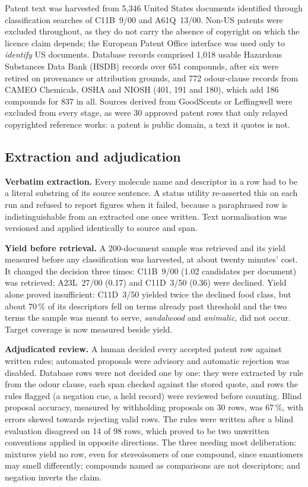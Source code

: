 \documentclass[
  computerscience
]{genesisl1-paper}
\begin{document}
Patent text was harvested from 5{,}346 United States documents identified through
classification searches of C11B~9/00 and A61Q~13/00. Non-US patents were excluded
throughout, as they do not carry the absence of copyright on which the licence claim
depends; the European Patent Office interface was used only to \emph{identify} US
documents. Database records comprised 1{,}018 usable Hazardous Substances Data Bank
(HSDB) records over 651 compounds, after six were retired on provenance or attribution
grounds, and 772 odour-clause records from CAMEO Chemicals, OSHA and NIOSH (401, 191 and
180), which add 186 compounds for 837 in all. Sources derived from GoodScents or
Leffingwell were excluded from every stage, as were 30 approved patent rows that only
relayed copyrighted reference works: a patent is public domain, a text it quotes is not.

\subsection{Extraction and adjudication}

\textbf{Verbatim extraction.} Every molecule name and descriptor in a row had to be a
literal substring of its source sentence. A status utility re-asserted this on each run
and refused to report figures when it failed, because a paraphrased row is
indistinguishable from an extracted one once written. Text normalisation was versioned and
applied identically to source and span.

\textbf{Yield before retrieval.} A 200-document sample was retrieved and its yield
measured before any classification was harvested, at about twenty minutes' cost. It
changed the decision three times: C11B~9/00 (1.02 candidates per document) was
retrieved; A23L~27/00 (0.17) and C11D~3/50 (0.36) were declined. Yield alone proved
insufficient: C11D~3/50 yielded twice the declined food class, but about 70\,\% of its
descriptors fell on terms already past threshold and the two terms the sample was meant
to serve, \emph{sandalwood} and \emph{animalic}, did not occur. Target coverage is now
measured beside yield.

\textbf{Adjudicated review.} A human decided every accepted patent row against written
rules; automated proposals were advisory and automatic rejection was disabled. Database
rows were not decided one by one: they were extracted by rule from the odour clause, each
span checked against the stored quote, and rows the rules flagged (a negation cue, a held
record) were reviewed before counting. Blind proposal
accuracy, measured by withholding proposals on 30 rows, was 67\,\%, with errors skewed
towards rejecting valid rows. The rules were written after a blind evaluation disagreed
on 14 of 98 rows, which proved to be two unwritten conventions applied in opposite
directions. The three needing most deliberation: mixtures yield no row, even for
stereoisomers of one compound, since enantiomers may smell differently; compounds named
as comparisons are not descriptors; and negation inverts the claim.
\end{document}
